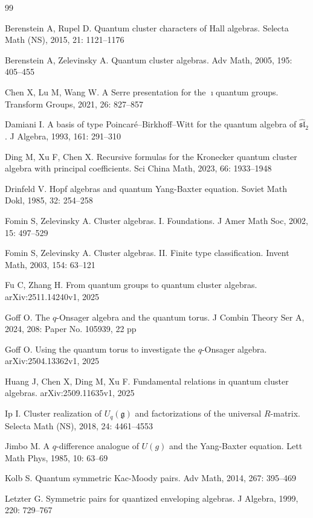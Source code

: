 \documentclass[reqno,11pt]{amsart}
\numberwithin{equation}{section}
\begin{document}
\begin{thebibliography}{99}

Berenstein A, Rupel D. Quantum cluster characters of Hall algebras. Selecta Math (NS), 2015, 21: 1121--1176

Berenstein A, Zelevinsky A. Quantum cluster algebras. Adv Math, 2005, 195: 405--455

Chen X, Lu M, Wang W. A Serre presentation for the $\imath$quantum groups. Transform Groups, 2021, 26: 827--857

Damiani I. A basis of type Poincar\'e--Birkhoff--Witt for the quantum algebra of $\widehat{\mathfrak{sl}}_2$. J Algebra, 1993, 161: 291--310

Ding M, Xu F, Chen X. Recursive formulas for the Kronecker quantum cluster algebra with principal coefficients. Sci China Math, 2023, 66: 1933--1948

Drinfeld V. Hopf algebras and quantum Yang-Baxter equation. Soviet Math Dokl, 1985, 32: 254--258

Fomin S, Zelevinsky A. Cluster algebras. I. Foundations. J Amer Math Soc, 2002, 15: 497--529

Fomin S, Zelevinsky A. Cluster algebras. II. Finite type classification. Invent Math, 2003, 154: 63--121

Fu C, Zhang H. From quantum groups to quantum cluster algebras. arXiv:2511.14240v1, 2025

Goff O. The $q$-Onsager algebra and the quantum torus. J Combin Theory Ser A, 2024, 208: Paper No. 105939, 22 pp

Goff O. Using the quantum torus to investigate the $q$-Onsager algebra. arXiv:2504.13362v1, 2025

Huang J, Chen X, Ding M, Xu F. Fundamental relations in quantum cluster algebras. arXiv:2509.11635v1, 2025

Ip I. Cluster realization of $U_q(\mathfrak{g})$ and factorizations of the universal $R$-matrix. Selecta Math (NS), 2018, 24: 4461--4553

Jimbo M. A $q$-difference analogue of $U(g)$ and the Yang-Baxter equation. Lett Math Phys, 1985, 10: 63--69

Kolb S. Quantum symmetric Kac-Moody pairs. Adv Math, 2014, 267: 395--469

Letzter G. Symmetric pairs for quantized enveloping algebras. J Algebra, 1999, 220: 729--767



\end{thebibliography}
\end{document}
